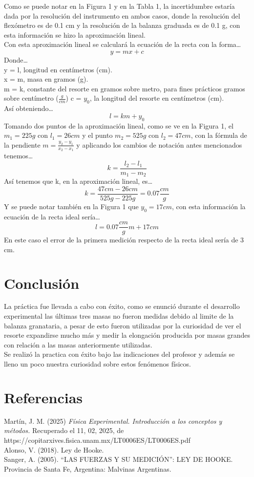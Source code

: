 \documentclass[12pt,a4paper]{article}
\begin{document}
Como se puede notar en la Figura 1 y en la Tabla 1, la incertidumbre estaría dada por la resolución del instrumento en ambos casos, donde la resolución del flexómetro es de 0.1 cm y la resolución de la balanza graduada es de 0.1 g, con esta información se hizo la aproximación lineal.\\
Con esta aproximación lineal se calculará la ecuación de la recta con la forma…
\[y = mx+c\]
Donde…\\
y = l, longitud en centímetros (cm).\\
x = m, masa en gramos (g).\\
m = k, constante del resorte en gramos sobre metro, para fines prácticos gramos sobre centímetro ($\frac{g}{cm}$)
c = $y_0$, la longitud del resorte en centímetros (cm).\\
Así obteniendo…
\[l = k m + y_0\]
Tomando dos puntos de la aproximación lineal, como se ve en la Figura 1, el $m_1 = 225 g$ con $l_1 = 26 cm$ y el punto $m_2 = 525 g$ con $l_2 = 47 cm$, con la fórmula de la pendiente $m = \frac{y_2 - y_1}{x_2 - x_1}$ y aplicando los cambios de notación antes mencionados tenemos…
\[k = \frac{l_2 -  l_1}{m_1 - m_2}\]
Así tenemos que k, en la aproximación lineal, es…
\[k = \frac{47 cm -  26 cm}{525 g - 225 g} = 0.07 \frac{cm}{g}\]
Y se puede notar también en la Figura 1 que $y_0 = 17 cm$, con esta información la ecuación de la recta ideal sería…
\[ l = 0.07 \frac{cm}{g} m + 17 cm\]
En este caso el error de la primera medición respecto de la recta ideal sería de 3 cm. 

\section{Conclusión}

La práctica fue llevada a cabo con éxito, como se enunció durante el desarrollo experimental las últimas tres masas no fueron medidas debido al limite de la balanza granataria, a pesar de esto fueron utilizadas por la curiosidad de ver el resorte expandirse mucho más y medir la elongación producida por masas grandes con relación a las masas anteriormente utilizadas. \\
Se realizó la practica con éxito bajo las indicaciones del profesor y además se lleno un poco nuestra curiosidad sobre estos fenómenos físicos.

\section{Referencias}

Martín, J. M. (2025) \textit{Física Experimental. Introducción a los conceptos y métodos.} Recuperado el 11, 02, 2025, de https://copitarxives.fisica.unam.mx/LT0006ES/LT0006ES.pdf \\

Alonso, V. (2018). Ley de Hooke.\\

Sanger, A. (2005). “LAS FUERZAS Y SU MEDICIÓN”: LEY DE HOOKE. Provincia de Santa Fe, Argentina: Malvinas Argentinas.\\
\end{document}
